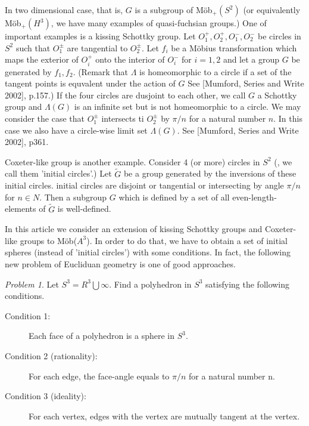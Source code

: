 \documentclass[dvipdfmx]{interact}
\theoremstyle{plain}%
\theoremstyle{definition}
\theoremstyle{remark}
\theoremstyle{problemstyle}
\newtheorem{problem}{Problem}[section] %
\begin{document}
In two dimensional case, that is, $G$ is a subgroup of M\"ob$_+(S^2)$
(or equivalently M\"ob$_+(H^3)$, we have many examples of quasi-fuchsian
groups.) One of important examples is a kissing Schottky group.
Let $O_1^+, O_2^+, O_1^-, O_2^-$ be circles in $S^2$ such that
$O_1^{\pm}$ are tangential to $O_2^{\pm}$. Let $f_i$ be a M\"obius
transformation which maps the exterior of $O_i^+$ onto the interior of
$O_i^{-}$ for $i = 1, 2$ and let a group $G$ be generated by $f_1, f_2$.
(Remark that $\Lambda$ is homeomorphic to a circle if a set of the
tangent points is equvalent under the action of $G$ See [Mumford,
Series and Write 2002], p.157.) If the four circles are dusjoint to each
other, we call $G$ a Schottky group and $\Lambda(G)$ is an infinite set
but is not homeomorphic to a circle. We may consider the case that
$O_1^{\pm}$ intersects ti $O_2^{\pm}$ by $\pi/n$ for a natural number
$n$. In this case we also have a circle-wise limit set $\Lambda(G)$.
See [Mumford, Series and Write 2002], p361.

Coxeter-like group is another example. Consider 4 (or more) circles in
$S^2$ (, we call them 'initial circles'.) Let $\tilde G$ be a group generated
by the inversions of these initial circles.%
initial circles are disjoint or tangential or intersecting  by angle
$\pi/n$ for $n \in N$. Then a subgroup $G$ which is defined by a set of
all even-length-elements of $\tilde G$ is well-defined.

In this article we consider an extension of kissing Schottky groups and
Coxeter-like groups to M\"ob($A^3$). In order to do that, we have to
obtain a set of initial spheres (instead of 'initial circles') with some
conditions. In fact, the following new problem of Eucliduan geometry is
one of good approaches.

\begin{problem}
 Let $S^3 = R^3 \bigcup {\infty}$. Find a polyhedron in $S^3$ satisfying
 the following conditions.
 \begin{description}
  \item[Condition 1:] Each face of a polyhedron is a sphere in $S^3$.
  \item[Condition 2 (rationality):] For each edge, the face-angle equals to $\pi/n$
             for a natural number n.
  \item[Condition 3 (ideality):] For each vertex, edges with the vertex are
             mutually tangent at the vertex.
 \end{description}
\end{problem}
\end{document}
